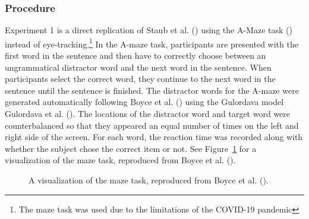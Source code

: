 \documentclass[
  12pt,
  letterpaper,
]{scrreprt}
\begin{document}
\subsubsection{Procedure}\label{procedure}

Experiment 1 is a direct replication of Staub et al.
() using the A-Maze
task () instead
of eye-tracking.\footnote{The maze task was used due to the limitations
  of the COVID-19 pandemic} In the A-maze task, participants are
presented with the first word in the sentence and then have to correctly
choose between an ungrammatical distractor word and the next word in the
sentence. When participants select the correct word, they continue to
the next word in the sentence until the sentence is finished. The
distractor words for the A-maze were generated automatically following
Boyce et al. () using the
Gulordava model Gulordava et al.
(). The
locations of the distractor word and target word were counterbalanced so
that they appeared an equal number of times on the left and right side
of the screen. For each word, the reaction time was recorded along with
whether the subject chose the correct item or not. See
Figure~\ref{fig-mazevisualization} for a visualization of the maze task,
reproduced from Boyce et al.
().

\begin{figure}[htbp]

\caption{\label{fig-mazevisualization}A visualization of the maze task,
reproduced from Boyce et al.
().}


\end{figure}%
\end{document}
